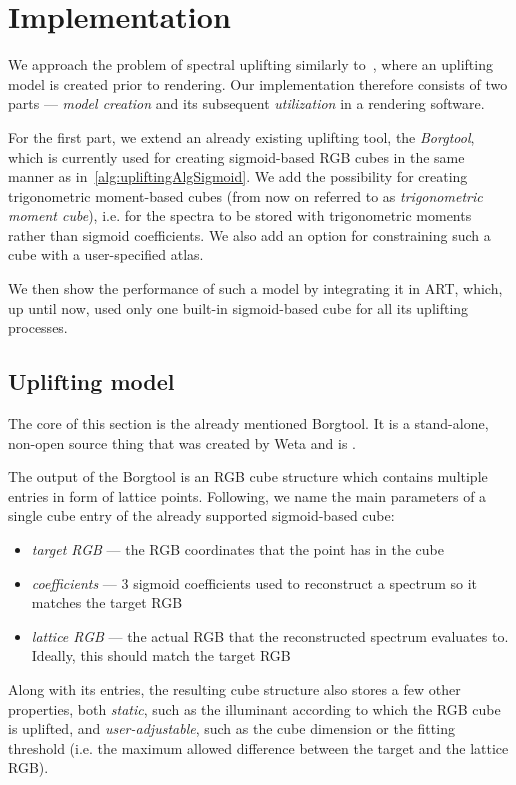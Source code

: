 \chapter{Implementation} \label{chap:implementation}

We approach the problem of spectral uplifting similarly to~\citet{upsamplingJakobHanika}, where an uplifting model is created prior to rendering. Our implementation therefore consists of two parts --- \emph{model creation} and its subsequent \emph{utilization} in a rendering software. 

For the first part, we extend an already existing uplifting tool, the \emph{Borgtool}, which is currently used for creating sigmoid-based RGB cubes in the same manner as in~\cref{alg:upliftingAlgSigmoid}. We add the possibility for creating trigonometric moment-based cubes (from now on referred to as \emph{trigonometric moment cube}), i.e. for the spectra to be stored with trigonometric moments rather than sigmoid coefficients. We also add an option for constraining such a cube with a user-specified atlas.

We then show the performance of such a model by integrating it in ART, which, up until now, used only one built-in sigmoid-based cube for all its uplifting processes.

\section{Uplifting model}

The core of this section is the already mentioned Borgtool. It is a stand-alone, non-open source thing that was created by Weta and is .

The output of the Borgtool is an RGB cube structure which contains multiple entries in form of lattice points. Following, we name the main parameters of a single cube entry of the already supported sigmoid-based cube:
\begin{itemize}
	\item \emph{target RGB} --- the RGB coordinates that the point has in the cube
	\item \emph{coefficients} --- 3 sigmoid coefficients used to reconstruct a spectrum so it matches the target RGB
	\item \emph{lattice RGB} --- the actual RGB that the reconstructed spectrum evaluates to. Ideally, this should match the target RGB
\end{itemize}
Along with its entries, the resulting cube structure also stores a few other properties, both \emph{static}, such as the illuminant according to which the RGB cube is uplifted, and \emph{user-adjustable}, such as the cube dimension or the fitting threshold (i.e. the maximum allowed difference between the target and the lattice RGB).

